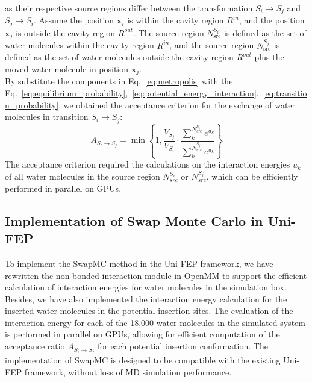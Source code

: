 \documentclass[journal=jacsat,manuscript=article]{achemso}
\newcommand*\YE[1]{Ye: \texttt{\textbf{#1}}}
\begin{document}
as their respective source regions differ between the transformation $S_i \to S_j$ and $S_j \to S_i$.
Assume the position $\mathbf{x}_i$ is within the cavity region $R^{in}$, and the position $\mathbf{x}_j$ is outside the cavity region $R^{out}$.
The source region $N_{\text{src}}^{S_i}$ is defined as the set of water molecules within the cavity region $R^{in}$, 
and the source region $N_{\text{src}}^{S_j}$ is defined as the set of water molecules outside the cavity region $R^{out}$ plus the moved water molecule in position $\textbf{x}_j$. \\
\newline
By substitute the components in Eq.~\ref{eq:metropolis} with the Eq.~\ref{eq:equilibrium_probability},~\ref{eq:potential_energy_interaction},~\ref{eq:transition_probability},
we obtained the acceptance criterion for the exchange of water molecules in transition $S_i \to S_j$:
\begin{equation}\label{eq:acceptance_criterion}
A_{S_i \to S_j} = \min \left\{1, \frac{V_{S_j}}{V_{S_i}} \cdot \frac{\sum^{N^{S_i}_{src}}_k{e^{u_k}}}{\sum^{N^{S_j}_{src}}_k{e^{u_k}}} \right\}
\end{equation}
\noindent The acceptance criterion required the calculations on the interaction energies $u_k$ of all water molecules in the source region $N^{S_i}_{src}$ or $N^{S_j}_{src}$,
which can be efficiently performed in parallel on GPUs.
\subsection{Implementation of Swap Monte Carlo in Uni-FEP}
To implement the SwapMC method in the Uni-FEP framework, we have rewritten the non-bonded interaction module in OpenMM to support the efficient calculation of interaction energies for water molecules in the simulation box.
Besides, we have also implemented the interaction energy calculation for the inserted water molecules in the potential insertion sites.
The evaluation of the interaction energy for each of the 18,000 water molecules in the simulated system is performed in parallel on GPUs,
allowing for efficient computation of the acceptance ratio $A_{S_i \to S_j}$ for each potential insertion conformation.
The implementation of SwapMC is designed to be compatible with the existing Uni-FEP framework, 
without loss of MD simulation performance.
\end{document}
